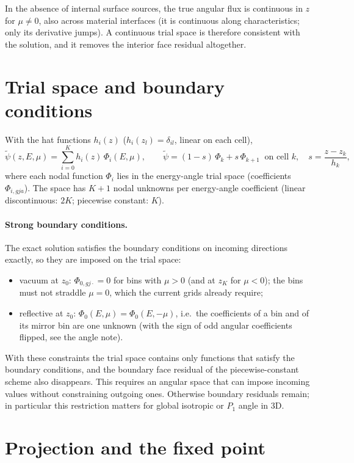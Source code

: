 \documentclass[11pt]{article}
\newcommand{\tpsi}{\tilde\psi}
\begin{document}
In the absence of internal surface sources, the true angular flux is continuous
in $z$ for $\mu\neq0$, also across material
interfaces (it is continuous along characteristics; only its derivative jumps). A
continuous trial space is therefore consistent with the solution, and it removes the
interior face residual altogether.

\section{Trial space and boundary conditions}

With the hat functions $h_i(z)$ ($h_i(z_l)=\delta_{il}$, linear on each cell),
\begin{equation}
  \tpsi(z,E,\mu) = \sum_{i=0}^{K} h_i(z)\,\Phi_i(E,\mu),\qquad
  \tpsi = (1-s)\,\Phi_k + s\,\Phi_{k+1}\ \text{ on cell } k,\quad s=\frac{z-z_k}{h_k},
\end{equation}
where each nodal function $\Phi_i$ lies in the energy-angle trial space (coefficients
$\Phi_{i,gja}$). The space has $K+1$ nodal unknowns per energy-angle coefficient
(linear discontinuous: $2K$; piecewise constant: $K$).

\paragraph{Strong boundary conditions.} The exact solution satisfies the boundary
conditions on incoming directions exactly, so they are imposed on the trial space:
\begin{itemize}
  \item vacuum at $z_0$: $\Phi_{0,gj\cdot}=0$ for bins with $\mu>0$ (and at $z_K$ for
  $\mu<0$); the bins must not straddle $\mu=0$, which the current grids already require;
  \item reflective at $z_0$: $\Phi_0(E,\mu)=\Phi_0(E,-\mu)$, i.e.\ the coefficients of a
  bin and of its mirror bin are one unknown (with the sign of odd angular coefficients
  flipped, see the angle note).
\end{itemize}
With these constraints the trial space contains only functions that satisfy the
boundary conditions, and the boundary face residual of the piecewise-constant scheme
also disappears. This requires an angular space that can impose incoming values
without constraining outgoing ones. Otherwise boundary residuals remain; in
particular this restriction matters for global isotropic or $P_1$ angle in 3D.

\section{Projection and the fixed point}
\end{document}
